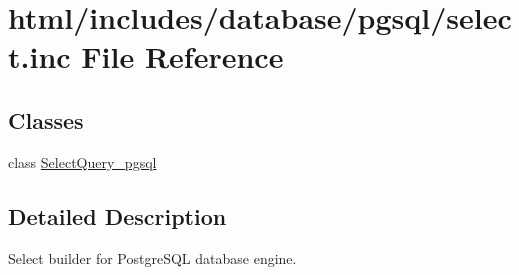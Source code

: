 \hypertarget{pgsql_2select_8inc}{
\section{html/includes/database/pgsql/select.inc File Reference}
\label{pgsql_2select_8inc}
}
\subsection*{Classes}
\begin{DoxyCompactItemize}
\item 
class \hyperlink{classSelectQuery__pgsql}{SelectQuery\_\-pgsql}
\end{DoxyCompactItemize}


\subsection{Detailed Description}
Select builder for PostgreSQL database engine. 